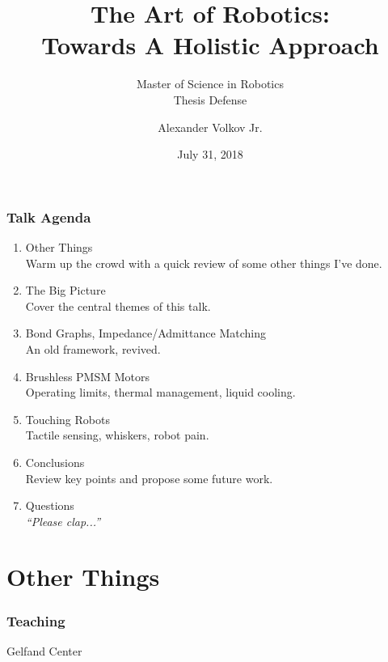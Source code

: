 \documentclass[aspectratio=169]{beamer}
\title{The Art of Robotics:\\\vspace{0.2em}\huge{Towards A Holistic Approach}}
\subtitle{Master of Science in Robotics\\Thesis Defense}
\author{Alexander Volkov Jr.}
\date{July 31, 2018}
\begin{document}
	\setcounter{showProgressBar}{0}
	\setcounter{showSlideNumbers}{0}

	\frame{\titlepage}

	\begin{frame}
		\frametitle{Talk Agenda}
		\begin{enumerate}
			\item Other Things \\ 
				\textcolor{AVThesisGrey}{\footnotesize\hspace{1em} Warm up the crowd with a quick review of some other things I've done.}
			\item The Big Picture \\ 
				\textcolor{AVThesisGrey}{\footnotesize\hspace{1em} Cover the central themes of this talk.}
			
			\item Bond Graphs, Impedance/Admittance Matching \\
				\textcolor{AVThesisGrey}{\footnotesize\hspace{1em} An old framework, revived.}
			
			\item Brushless PMSM Motors \\
				\textcolor{AVThesisGrey}{\footnotesize\hspace{1em} Operating limits, thermal management, liquid cooling.}
	
			\item Touching Robots \\
				\textcolor{AVThesisGrey}{\footnotesize\hspace{1em} Tactile sensing, whiskers, robot pain.}
			
			\item Conclusions \\ 
				\textcolor{AVThesisGrey}{\footnotesize\hspace{1em} Review key points and propose some future work.}
			
			\item Questions \\
				\textcolor{AVThesisGrey}{\footnotesize\hspace{1em} \emph{``Please clap...''}}
		\end{enumerate}
	\end{frame}

	\setcounter{framenumber}{0}
	\setcounter{showProgressBar}{1}
	\setcounter{showSlideNumbers}{1}
	
	\section{Other Things}
		\begin{frame}
			\frametitle{Teaching}
			Gelfand Center
		\end{frame}
	
\end{document}
